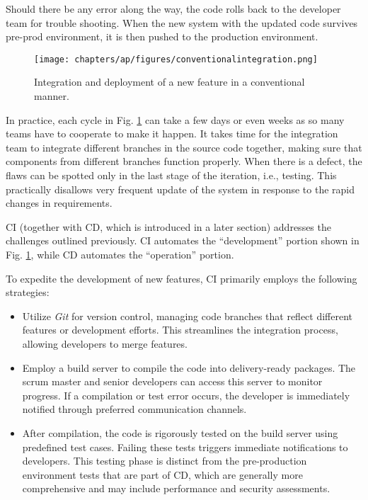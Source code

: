 Should there be any error along the way, the code rolls back to the developer team for trouble shooting. When the new system with the updated code survives pre-prod environment, it is then pushed to the production environment.
\begin{figure}[htbp]
	\centering
	\texttt{[image: chapters/ap/figures/conventionalintegration.png]}
	\caption{Integration and deployment of a new feature in a conventional manner.} \label{ch:cicd:fig:conventionalintegration}
\end{figure}

In practice, each cycle in Fig. \ref{ch:cicd:fig:conventionalintegration} can take a few days or even weeks as so many teams have to cooperate to make it happen. It takes time for the integration team to integrate different branches in the source code together, making sure that components from different branches function properly. When there is a defect, the flaws can be spotted only in the last stage of the iteration, i.e., testing. This practically disallows very frequent update of the system in response to the rapid changes in requirements.

CI (together with CD, which is introduced in a later section) addresses the challenges outlined previously. CI automates the ``development'' portion shown in Fig. \ref{ch:cicd:fig:conventionalintegration}, while CD automates the ``operation'' portion.

To expedite the development of new features, CI primarily employs the following strategies:
\begin{itemize}
	\item Utilize \textit{Git} for version control, managing code branches that reflect different features or development efforts. This streamlines the integration process, allowing developers to merge features.
	\item Employ a build server to compile the code into delivery-ready packages. The scrum master and senior developers can access this server to monitor progress. If a compilation or test error occurs, the developer is immediately notified through preferred communication channels.
	\item After compilation, the code is rigorously tested on the build server using predefined test cases. Failing these tests triggers immediate notifications to developers. This testing phase is distinct from the pre-production environment tests that are part of CD, which are generally more comprehensive and may include performance and security assessments.
\end{itemize}

